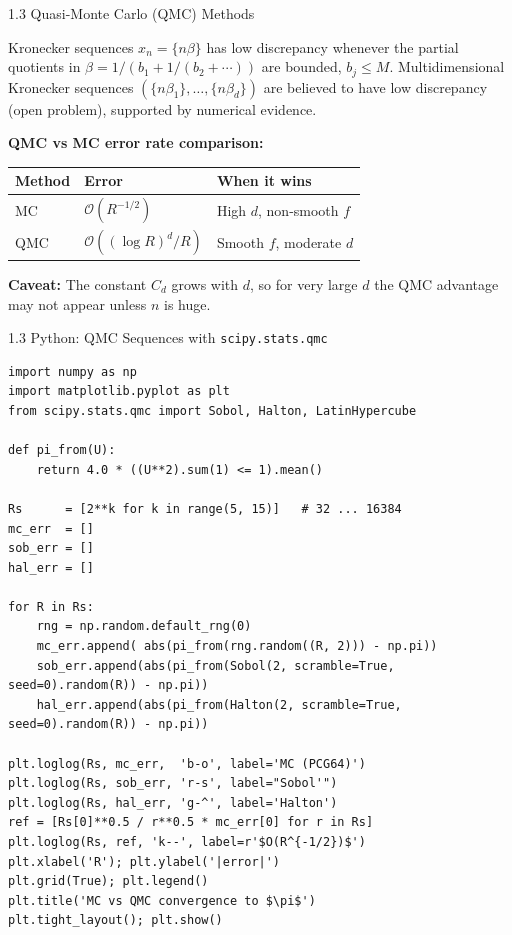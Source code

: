 \documentclass[aspectratio=169,10pt]{beamer}
\begin{document}
\begin{frame}[allowframebreaks]{1.3 Quasi-Monte Carlo (QMC) Methods}
  \begin{block}{Kronecker sequences}
    $x_n = \{n\beta\}$ has low discrepancy whenever the partial quotients
    in $\beta = 1/(b_1 + 1/(b_2 + \cdots))$ are bounded, $b_j \le M$.
    Multidimensional Kronecker sequences $(\{n\beta_1\},\ldots,\{n\beta_d\})$
    are believed to have low discrepancy (open problem), supported by
    numerical evidence.
  \end{block}

  \framebreak

  \textbf{QMC vs MC error rate comparison:}
  \begin{center}
  \begin{tabular}{lll}
    \toprule
    Method & Error & When it wins \\
    \midrule
    MC & $\mathcal{O}(R^{-1/2})$ & High $d$, non-smooth $f$ \\
    QMC & $\mathcal{O}((\log R)^d / R)$ & Smooth $f$, moderate $d$ \\
    \bottomrule
  \end{tabular}
  \end{center}

  \textbf{Caveat:} The constant $C_d$ grows with $d$, so for very large
  $d$ the QMC advantage may not appear unless $n$ is huge.

\end{frame}

\begin{frame}[fragile]{1.3 Python: QMC Sequences with \texttt{scipy.stats.qmc}}

\begin{lstlisting}[style=python, caption={Comparing MC and QMC for pi estimation}]
import numpy as np
import matplotlib.pyplot as plt
from scipy.stats.qmc import Sobol, Halton, LatinHypercube

def pi_from(U):
    return 4.0 * ((U**2).sum(1) <= 1).mean()

Rs      = [2**k for k in range(5, 15)]   # 32 ... 16384
mc_err  = []
sob_err = []
hal_err = []

for R in Rs:
    rng = np.random.default_rng(0)
    mc_err.append( abs(pi_from(rng.random((R, 2))) - np.pi))
    sob_err.append(abs(pi_from(Sobol(2, scramble=True, seed=0).random(R)) - np.pi))
    hal_err.append(abs(pi_from(Halton(2, scramble=True, seed=0).random(R)) - np.pi))

plt.loglog(Rs, mc_err,  'b-o', label='MC (PCG64)')
plt.loglog(Rs, sob_err, 'r-s', label="Sobol'")
plt.loglog(Rs, hal_err, 'g-^', label='Halton')
ref = [Rs[0]**0.5 / r**0.5 * mc_err[0] for r in Rs]
plt.loglog(Rs, ref, 'k--', label=r'$O(R^{-1/2})$')
plt.xlabel('R'); plt.ylabel('|error|')
plt.grid(True); plt.legend()
plt.title('MC vs QMC convergence to $\pi$')
plt.tight_layout(); plt.show()
\end{lstlisting}

\end{frame}
\end{document}
